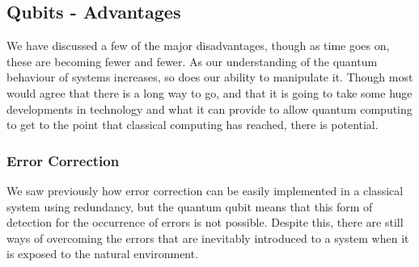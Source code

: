 \subsection{Qubits - Advantages}
We have discussed a few of the major disadvantages, though as time goes on, these are becoming fewer and fewer. As our understanding of the quantum behaviour of systems increases, so does our ability to manipulate it. Though most would agree that there is a long way to go, and that it is going to take some huge developments in technology and what it can provide to allow quantum computing to get to the point that classical computing has reached, there is potential.

\subsubsection{Error Correction}
We saw previously how error correction can be easily implemented in a classical system using redundancy, but the quantum qubit means that this form of detection for the occurrence of errors is not possible. Despite this, there are still ways of overcoming the errors that are inevitably introduced to a system when it is exposed to the natural environment. 

